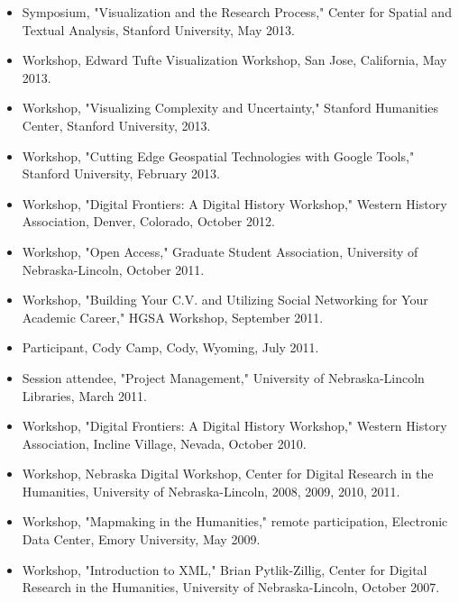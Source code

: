\documentclass[10pt]{article}
\begin{document}
\begin{itemize}
  \item Symposium, "Visualization and the Research Process," Center for Spatial and Textual Analysis, Stanford University, May 2013.
  
  \item Workshop, Edward Tufte Visualization Workshop, San Jose, California, May 2013.
  
  \item Workshop, "Visualizing Complexity and Uncertainty," Stanford Humanities Center, Stanford University, 2013.
  
  \item Workshop, "Cutting Edge Geospatial Technologies with Google Tools," Stanford University, February 2013.
  
  \item Workshop, "Digital Frontiers: A Digital History Workshop," Western History Association, Denver, Colorado, October 2012.
  
  \item Workshop, "Open Access," Graduate Student Association, University of Nebraska-Lincoln, October 2011.
  
  \item Workshop, "Building Your C.V. and Utilizing Social Networking for Your Academic Career," HGSA Workshop, September 2011.
  
  \item Participant, Cody Camp, Cody, Wyoming, July 2011.
  
  \item Session attendee, "Project Management," University of Nebraska-Lincoln Libraries, March 2011.
  
  \item Workshop, "Digital Frontiers: A Digital History Workshop," Western History Association, Incline Village, Nevada, October 2010.
  
  \item Workshop, Nebraska Digital Workshop, Center for Digital Research in the Humanities, University of Nebraska-Lincoln, 2008, 2009, 2010, 2011.
  
  \item Workshop, "Mapmaking in the Humanities," remote participation, Electronic Data Center, Emory University, May 2009.
  
  \item Workshop, "Introduction to XML," Brian Pytlik-Zillig, Center for Digital Research in the Humanities, University of Nebraska-Lincoln, October 2007.
\end{itemize}
\end{document}
